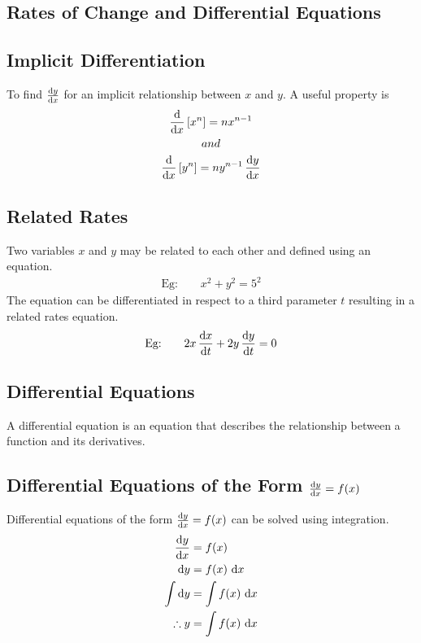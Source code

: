 \documentclass[10pt, a4paper, titlepage]{article}
\begin{document}
\begin{multicols*}{3}
	\hrulefill

	\section{Rates of Change and Differential Equations}
	\subsection{Implicit Differentiation}
	To find $\dv{y}{x}$ for an implicit relationship between $x$ and $y$. A useful property is
	\begin{gather}
		\begin{align}
			\dv{x}\left[x^n\right]=nx^{n-1}
		\end{align}\\
		and\\
		\begin{align}
			\dv{x}\left[y^n\right]=ny^{n-1}\, \dv{y}{x}
		\end{align}
	\end{gather}

	\dotfill
	\subsection{Related Rates}
	Two variables $x$ and $y$ may be related to each other and defined using an equation.
	\begin{align}
		\text{Eg:}\qquad x^2+y^2=5^2
	\end{align}
	The equation can be differentiated in respect to a third parameter $t$ resulting in a related rates equation.
	\begin{align}
		\text{Eg:}\qquad 2x\, \dv{x}{t}+2y\, \dv{y}{t}=0
	\end{align}

	\dotfill
	\subsection{Differential Equations}
	A differential equation is an equation that describes the relationship between a function and its derivatives.

	\dotfill
	\subsection{Differential Equations of the Form $\dv{y}{x}=f(x)$}
	Differential equations of the form $\dv{y}{x}=f(x)$ can be solved using integration.
	\begin{align}
		\dv{y}{x}&=f(x)\\
		\dd{y}&=f(x)\, \dd{x}\\
		\int \dd{y}&=\int f(x)\, \dd{x}\\
		\therefore y&=\int f(x)\, \dd{x}
	\end{align}


\end{multicols*}
\end{document}
